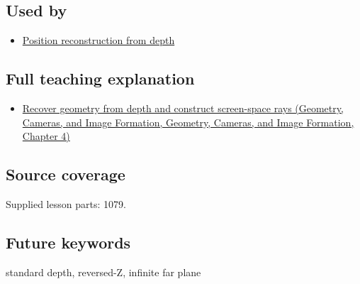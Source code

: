 \subsection{Used by}\label{appendix-1bc40b08db4a-used-by}

\begin{itemize}
\tightlist
\item
  \hyperref[appendix-2cbf2968e866]{Position reconstruction from depth}
\end{itemize}

\subsection{Full teaching explanation}\label{appendix-1bc40b08db4a-full-teaching-explanation}

\begin{itemize}
\tightlist
\item
  \href{../03-Geometry-Cameras-and-Image-Formation/main.pdf\#nameddest=02-foundations-ii-ch035-recover-geometry-from-depth-and-construct-screen-space-rays}{Recover geometry from depth and construct screen-space rays (Geometry, Cameras, and Image Formation, Geometry, Cameras, and Image Formation, Chapter 4)}
\end{itemize}

\subsection{Source coverage}\label{appendix-1bc40b08db4a-source-coverage}

Supplied lesson parts: 1079.

\subsection{Future keywords}\label{appendix-1bc40b08db4a-future-keywords}

standard depth, reversed-Z, infinite far plane
